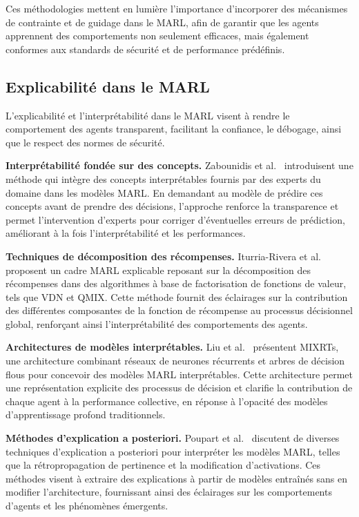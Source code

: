 \documentclass[pdflatex,sn-mathphys-num]{sn-jnl}%
\theoremstyle{thmstyleone}%
\theoremstyle{thmstyletwo}%
\theoremstyle{thmstylethree}%
\begin{document}
Ces méthodologies mettent en lumière l’importance d’incorporer des mécanismes de contrainte et de guidage dans le MARL, afin de garantir que les agents apprennent des comportements non seulement efficaces, mais également conformes aux standards de sécurité et de performance prédéfinis.


\subsection{Explicabilité dans le MARL}\label{sub-sec:rel_evaluation}

L’explicabilité et l’interprétabilité dans le MARL visent à rendre le comportement des agents transparent, facilitant la confiance, le débogage, ainsi que le respect des normes de sécurité.

\textbf{Interprétabilité fondée sur des concepts.} Zabounidis et al.~\cite{zabounidis2023concept} introduisent une méthode qui intègre des concepts interprétables fournis par des experts du domaine dans les modèles MARL. En demandant au modèle de prédire ces concepts avant de prendre des décisions, l’approche renforce la transparence et permet l’intervention d’experts pour corriger d’éventuelles erreurs de prédiction, améliorant à la fois l’interprétabilité et les performances.

\textbf{Techniques de décomposition des récompenses.} Iturria-Rivera et al.~\cite{iturria2024explainable} proposent un cadre MARL explicable reposant sur la décomposition des récompenses dans des algorithmes à base de factorisation de fonctions de valeur, tels que VDN et QMIX. Cette méthode fournit des éclairages sur la contribution des différentes composantes de la fonction de récompense au processus décisionnel global, renforçant ainsi l’interprétabilité des comportements des agents.

\textbf{Architectures de modèles interprétables.} Liu et al.~\cite{liu2022mixrts} présentent MIXRTs, une architecture combinant réseaux de neurones récurrents et arbres de décision flous pour concevoir des modèles MARL interprétables. Cette architecture permet une représentation explicite des processus de décision et clarifie la contribution de chaque agent à la performance collective, en réponse à l’opacité des modèles d’apprentissage profond traditionnels.

\textbf{Méthodes d’explication a posteriori.} Poupart et al.~\cite{poupart2025perspectives} discutent de diverses techniques d’explication a posteriori pour interpréter les modèles MARL, telles que la rétropropagation de pertinence et la modification d’activations. Ces méthodes visent à extraire des explications à partir de modèles entraînés sans en modifier l’architecture, fournissant ainsi des éclairages sur les comportements d’agents et les phénomènes émergents.
\end{document}
